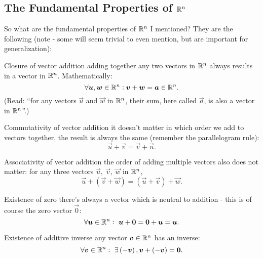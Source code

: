 \subsection{The Fundamental Properties of $\Rs[n]$}
So what are the fundamental properties of $\Rs[n]$ I mentioned? They are the following (note - some will seem trivial to even mention, but are important for generalization):
\begin{descitemize}
    \item[Closure of vector addition] adding together any two vectors in $\Rs[n]$ always results in a vector in $\Rs[n]$. Mathematically:
    \begin{equation}
        \forall\vec{u},\vec{w}\in\Rs[n]: \vec{v}+\vec{w}=\vec{a}\in\Rs[n].
        \label{eq:vector_addition_closure}
    \end{equation}
    (Read: \enquote{for any vectors $\vec{u}$ and $\vec{w}$ in $\Rs[n]$, their sum, here called $\vec{a}$, is also a vector in $\Rs[n]$}.)
    
    \item[Commutativity of vector addition] it doesn't matter in which order we add to vectors together, the result is always the same (remember the parallelogram rule):
    \begin{equation}
        \vec{u}+\vec{v}=\vec{v}+\vec{u}.
        \label{eq:vector_addition_commutative_2}
    \end{equation}

    \item[Associativity of vector addition] the order of adding multiple vectors also does not matter: for any three vectors $\vec{u},\ \vec{v},\ \vec{w}$ in $\Rs[n]$,
    \begin{equation}
        \vec{u}+\left(\vec{v}+\vec{w}\right) = \left(\vec{u}+\vec{v}\right)+\vec{w}.
        \label{eq:vector_addition_associative}
    \end{equation}
    
    \item[Existence of zero] there's always a vector which is neutral to addition - this is of course the zero vector $\vec{0}$:
    \begin{equation}
        \forall \vec{u}\in\Rs[n]:\ \vec{u}+\vec{0}=\vec{0}+\vec{u}=\vec{u}.
        \label{eq:vector_zero_existence}
    \end{equation}

    \item[Existence of additive inverse] any vector $\vec{v}\in\Rs[n]$ has an inverse:
    \begin{equation}
        \forall \vec{v}\in\Rs[n]:\ \exists\left(-\vec{v}\right), \vec{v}+\left(-\vec{v}\right) = \vec{0}.
        \label{eq:vector_zero_addition}
    \end{equation}


\end{descitemize}
